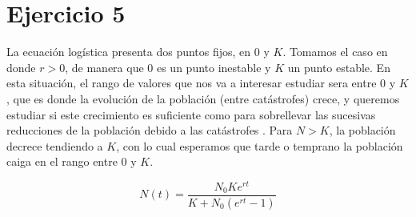 \section*{Ejercicio 5}
\graphicspath{{Figuras/ej_05/}}

La ecuación logística presenta dos puntos fijos, en $0$ y $K$.
Tomamos el caso en donde $r > 0$, de manera que $0$ es un punto inestable y $K$ un punto estable. En esta situación, el rango de valores que nos va a interesar estudiar sera entre 0 y $K$, que es donde la evolución de la población (entre catástrofes) crece, y queremos estudiar si este crecimiento es suficiente como para sobrellevar las sucesivas reducciones de la población debido a las catástrofes . Para $N > K$, la población decrece tendiendo a $K$, con lo cual esperamos que tarde o temprano la población caiga en el rango entre $0$ y $K$.

\begin{equation}
    N(t) = \frac{N_{0} K e^{rt}}{K+N_{0}(e^{rt}-1)}
    \label{eq:Logistica_Sol_Exacta}
\end{equation}

